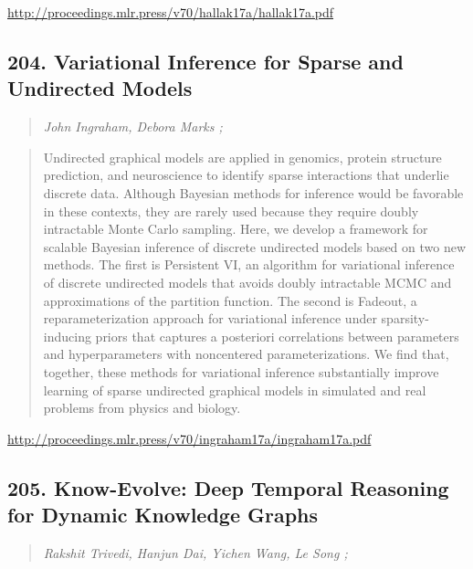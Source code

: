 \documentclass{article}
\begin{document}
\href{http://proceedings.mlr.press/v70/hallak17a/hallak17a.pdf}{http://proceedings.mlr.press/v70/hallak17a/hallak17a.pdf}

\subsection{204. Variational Inference for Sparse and Undirected Models}

\begin{quote}
\footnotesize{\textit{John Ingraham, Debora Marks ;}}

\end{quote}

\begin{quote}
    Undirected graphical models are applied in genomics, protein structure prediction, and neuroscience to identify sparse interactions that underlie discrete data. Although Bayesian methods for inference would be favorable in these contexts, they are rarely used because they require doubly intractable Monte Carlo sampling. Here, we develop a framework for scalable Bayesian inference of discrete undirected models based on two new methods. The first is Persistent VI, an algorithm for variational inference of discrete undirected models that avoids doubly intractable MCMC and approximations of the partition function. The second is Fadeout, a reparameterization approach for variational inference under sparsity-inducing priors that captures a posteriori correlations between parameters and hyperparameters with noncentered parameterizations. We find that, together, these methods for variational inference substantially improve learning of sparse undirected graphical models in simulated and real problems from physics and biology.  
\end{quote}

\href{http://proceedings.mlr.press/v70/ingraham17a/ingraham17a.pdf}{http://proceedings.mlr.press/v70/ingraham17a/ingraham17a.pdf}

\subsection{205. Know-Evolve: Deep Temporal Reasoning for Dynamic Knowledge Graphs}

\begin{quote}
\footnotesize{\textit{Rakshit Trivedi, Hanjun Dai, Yichen Wang, Le Song ;}}

\end{quote}
\end{document}
